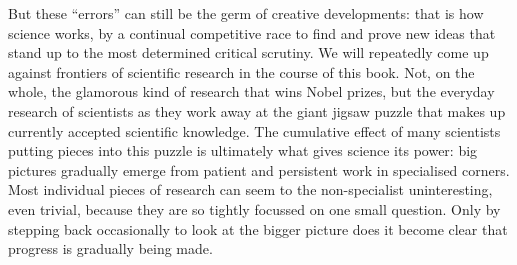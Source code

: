   But these ``errors'' can still be the germ of creative developments: that is 
  how science works, by a continual competitive race to find and prove new 
  ideas that stand up to the most determined critical scrutiny. We will 
  repeatedly come up against frontiers of scientific research in the course of 
  this book. Not, on the whole, the glamorous kind of research that wins Nobel 
  prizes, but the everyday research of scientists as they work away at the 
  giant jigsaw puzzle that makes up currently accepted scientific knowledge. 
  The cumulative effect of many scientists putting pieces into this puzzle is 
  ultimately what gives science its power: big pictures gradually emerge from 
  patient and persistent work in specialised corners. Most individual pieces of 
  research can seem to the non-specialist uninteresting, even trivial, because 
  they are so tightly focussed on one small question. Only by stepping back 
  occasionally to look at the bigger picture does it become clear that progress 
  is gradually being made. 


